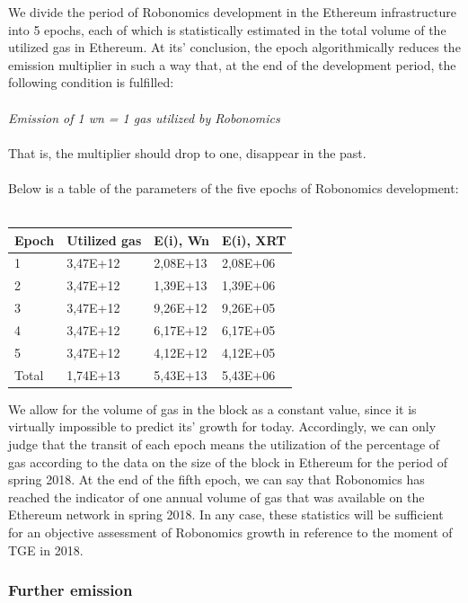 \documentclass{article}
\begin{document}
We divide the period of Robonomics development in the Ethereum infrastructure into 5 epochs, each of which is statistically estimated in the total volume of the utilized gas in Ethereum. At its' conclusion, the epoch algorithmically reduces the emission multiplier in such a way that, at the end of the development period, the following condition is fulfilled:
\\
\\
\textit{Emission of 1 wn = 1 gas utilized by Robonomics}
\\
\\
That is, the multiplier should drop to one, disappear in the past.
\\
\\
Below is a table of the parameters of the five epochs of Robonomics development:
\\
\\
\begin{tabular}{ |l |l |l |l}
 \textbf{Epoch} & \textbf{Utilized gas} & \textbf{E(i), Wn} & \textbf{E(i), XRT} \\ 
 \hline
 1 &  3,47E+12 & 2,08E+13 & 2,08E+06 \\ 
 2 &  3,47E+12 & 1,39E+13 & 1,39E+06 \\ 
 3 &  3,47E+12 & 9,26E+12 & 9,26E+05 \\ 
 4 &  3,47E+12 & 6,17E+12 & 6,17E+05 \\ 
 5 &  3,47E+12 & 4,12E+12 & 4,12E+05 \\ 
 Total &  1,74E+13 & 5,43E+13 & 5,43E+06 \\ 
\end{tabular}

We allow for the volume of gas in the block as a constant value, since it is virtually impossible to predict its' growth for today. Accordingly, we can only judge that the transit of each epoch means the utilization of the percentage of gas according to the data on the size of the block in Ethereum for the period of spring 2018. At the end of the fifth epoch, we can say that Robonomics has reached the indicator of one annual volume of gas that was available on the Ethereum network in spring 2018. In any case, these statistics will be sufficient for an objective assessment of Robonomics growth in reference to the moment of TGE in 2018.

\subsubsection{Further emission}
\end{document}
